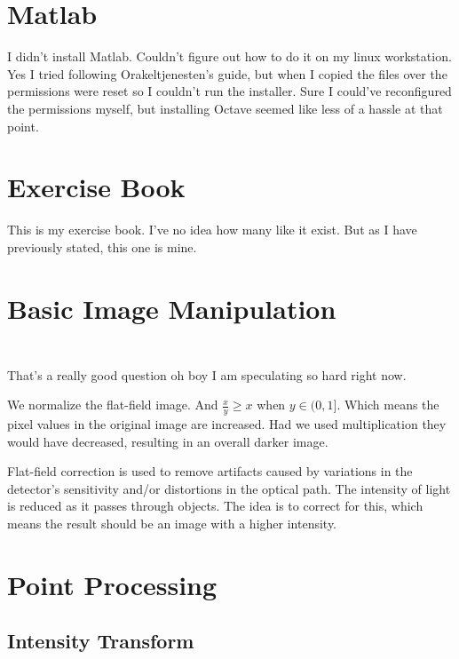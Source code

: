 \section{Matlab}
I didn't install Matlab.
Couldn't figure out how to do it on my linux workstation.
Yes I tried following Orakeltjenesten's guide, but when I copied the files over the permissions were reset so I couldn't run the installer.
Sure I could've reconfigured the permissions myself, but installing Octave seemed like less of a hassle at that point.

\section{Exercise Book}
This is my exercise book.
I've no idea how many like it exist.
But as I have previously stated, this one is mine.

\section{Basic Image Manipulation}
\subsubsection{}

\inputminted[linenos=true]{octave}{../code/exercise03.m}

\subsubsection{} %
That's a really good question oh boy I am speculating so hard right now.

We normalize the flat-field image.
And $\frac{x}{y} \geq x$ when $y \in (0, 1]$.
Which means the pixel values in the original image are increased.
Had we used multiplication they would have decreased, resulting in an overall darker image.

Flat-field correction is used to remove artifacts caused by variations in the detector's sensitivity and/or distortions in the optical path.
The intensity of light is reduced as it passes through objects.
The idea is to correct for this, which means the result should be an image with a higher intensity.

\section{Point Processing}

\subsection{Intensity Transform}


